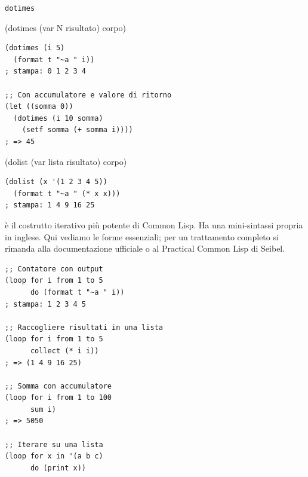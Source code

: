 
\begin{concetto}{\texttt{dotimes}}

\begin{sintassi}
(dotimes (var N risultato) corpo)
\end{sintassi}

\end{concetto}

\begin{esempio}
\begin{lstlisting}
(dotimes (i 5)
  (format t "~a " i))
; stampa: 0 1 2 3 4

;; Con accumulatore e valore di ritorno
(let ((somma 0))
  (dotimes (i 10 somma)
    (setf somma (+ somma i))))
; => 45
\end{lstlisting}
\end{esempio}

\seprule


\begin{sintassi}
(dolist (var lista risultato) corpo)
\end{sintassi}

\begin{esempio}
\begin{lstlisting}
(dolist (x '(1 2 3 4 5))
  (format t "~a " (* x x)))
; stampa: 1 4 9 16 25
\end{lstlisting}
\end{esempio}

\seprule


\begin{confronto}
 è il costrutto iterativo più potente di Common Lisp.
Ha una mini-sintassi propria in inglese. Qui vediamo le forme
essenziali; per un trattamento completo si rimanda alla documentazione
ufficiale o al Practical Common Lisp di Seibel.
\end{confronto}

\begin{esempio}
\begin{lstlisting}
;; Contatore con output
(loop for i from 1 to 5
      do (format t "~a " i))
; stampa: 1 2 3 4 5

;; Raccogliere risultati in una lista
(loop for i from 1 to 5
      collect (* i i))
; => (1 4 9 16 25)

;; Somma con accumulatore
(loop for i from 1 to 100
      sum i)
; => 5050

;; Iterare su una lista
(loop for x in '(a b c)
      do (print x))
\end{lstlisting}
\end{esempio}

